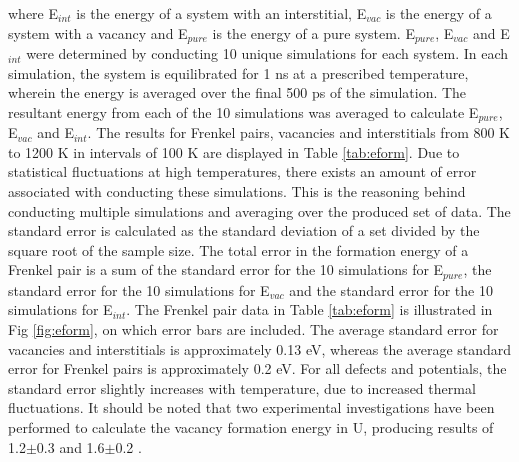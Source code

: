 \documentclass[review]{elsarticle}
\begin{document}
where E$_{int}$ is the energy of a system with an interstitial, E$_{vac}$ is the energy of a system with a vacancy and E$_{pure}$ is the energy of a pure system. E$_{pure}$, E$_{vac}$ and E$_{int}$ were determined by conducting 10 unique simulations for each system. In each simulation, the system is equilibrated for 1 ns at a prescribed temperature, wherein the energy is averaged over the final 500 ps of the simulation. The resultant energy from each of the 10 simulations was averaged to calculate E$_{pure}$, E$_{vac}$ and E$_{int}$. The results for Frenkel pairs, vacancies and interstitials from 800 K to 1200 K in intervals of 100 K are displayed in Table \ref{tab:eform}. Due to statistical fluctuations at high temperatures, there exists an amount of error associated with conducting these simulations. This is the reasoning behind conducting multiple simulations and averaging over the produced set of data. The standard error is calculated as the standard deviation of a set divided by the square root of the sample size. The total error in the formation energy of a Frenkel pair is a sum of the standard error for the 10 simulations for E$_{pure}$, the standard error for the 10 simulations for E$_{vac}$ and the standard error for the 10 simulations for E$_{int}$. The Frenkel pair data in Table \ref{tab:eform} is illustrated in Fig \ref{fig:eform}, on which error bars are included. The average standard error for vacancies and interstitials is approximately 0.13 eV, whereas the average standard error for Frenkel pairs is approximately 0.2 eV. For all defects and potentials, the standard error slightly increases with temperature, due to increased thermal fluctuations. It should be noted that two experimental investigations have been performed to calculate the vacancy formation energy in U, producing results of 1.2$\pm$0.3 \cite{matter1980} and 1.6$\pm$0.2 \cite{lund2013}.
\end{document}
